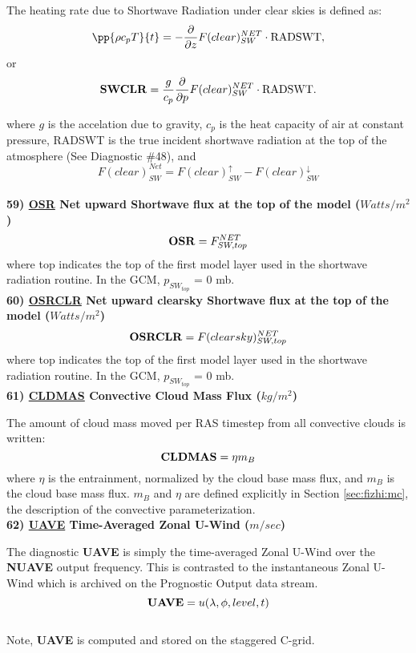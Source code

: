 \noindent
The heating rate due to Shortwave Radiation under clear skies is defined as:
\[
\pp{\rho c_p T}{t} = - {\partial \over \partial z} F(clear)_{SW}^{NET} \cdot {\rm RADSWT},
\]
or
\[
{\bf SWCLR} = \frac{g}{c_p } {\partial \over \partial p} F(clear)_{SW}^{NET}\cdot {\rm RADSWT} .
\]

\noindent
where $g$ is the accelation due to gravity,
$c_p$ is the heat capacity of air at constant pressure, RADSWT is the true incident
shortwave radiation at the top of the atmosphere (See Diagnostic \#48), and
\[
F(clear)_{SW}^{Net} = F(clear)_{SW}^\uparrow - F(clear)_{SW}^\downarrow
\]
\\

\noindent
{\bf 59)  \underline {OSR} Net upward Shortwave flux at the top of the model ($Watts/m^2$) }
\[
{\bf OSR}  =  F_{SW,top}^{NET}
\]                                                                                       
\noindent
where top indicates the top of the first model layer used in the shortwave radiation
routine.
In the GCM, $p_{SW_{top}}$ = 0 mb.
\\

\noindent
{\bf 60)  \underline {OSRCLR} Net upward clearsky Shortwave flux at the top of the model ($Watts/m^2$) }
\[
{\bf OSRCLR}  =  F(clearsky)_{SW,top}^{NET}
\]
\noindent
where top indicates the top of the first model layer used in the shortwave radiation
routine.
In the GCM, $p_{SW_{top}}$ = 0 mb.
\\


\noindent
{\bf 61)  \underline {CLDMAS} Convective Cloud Mass Flux ($kg/m^2$) } 

\noindent
The amount of cloud mass moved per RAS timestep from all convective clouds is written:
\[
{\bf CLDMAS} = \eta m_B
\]
where $\eta$ is the entrainment, normalized by the cloud base mass flux, and $m_B$ is
the cloud base mass flux. $m_B$ and $\eta$ are defined explicitly in Section \ref{sec:fizhi:mc}, the 
description of the convective parameterization.
\\



\noindent
{\bf 62)  \underline {UAVE} Time-Averaged Zonal U-Wind ($m/sec$) }

\noindent
The diagnostic {\bf UAVE} is simply the time-averaged Zonal U-Wind over
the {\bf NUAVE} output frequency.  This is contrasted to the instantaneous
Zonal U-Wind which is archived on the Prognostic Output data stream.
\[
{\bf UAVE} = u(\lambda, \phi, level , t)
\]
\\
Note, {\bf UAVE} is computed and stored on the staggered C-grid.
\\

